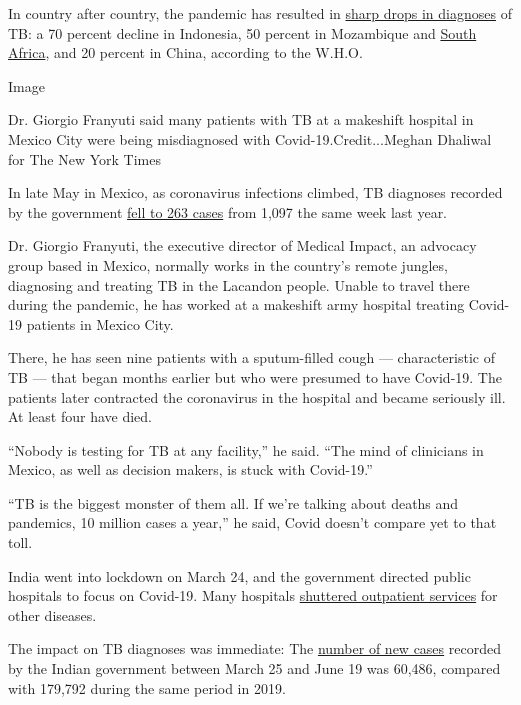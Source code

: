 In country after country, the pandemic has resulted in
\href{https://www.medrxiv.org/content/10.1101/2020.04.28.20079582v1}{sharp
drops in diagnoses} of TB: a 70 percent decline in Indonesia, 50 percent
in Mozambique and
\href{https://www.nicd.ac.za/wp-content/uploads/2020/05/Impact-of-Covid-19-interventions-on-TB-testing-in-South-Africa-10-May-2020.pdf}{South
Africa}, and 20 percent in China, according to the W.H.O.

Image

Dr. Giorgio Franyuti said many patients with TB at a makeshift hospital
in Mexico City were being misdiagnosed with Covid-19.Credit...Meghan
Dhaliwal for The New York Times

In late May in Mexico, as coronavirus infections climbed, TB diagnoses
recorded by the government
\href{https://www.gob.mx/salud/acciones-y-programas/direccion-general-de-epidemiologia-boletin-epidemiologico}{fell
to 263 cases} from 1,097 the same week last year.

Dr. Giorgio Franyuti, the executive director of Medical Impact, an
advocacy group based in Mexico, normally works in the country's remote
jungles, diagnosing and treating TB in the Lacandon people. Unable to
travel there during the pandemic, he has worked at a makeshift army
hospital treating Covid-19 patients in Mexico City.

There, he has seen nine patients with a sputum-filled cough ---
characteristic of TB --- that began months earlier but who were presumed
to have Covid-19. The patients later contracted the coronavirus in the
hospital and became seriously ill. At least four have died.

``Nobody is testing for TB at any facility,'' he said. ``The mind of
clinicians in Mexico, as well as decision makers, is stuck with
Covid-19.''

``TB is the biggest monster of them all. If we're talking about deaths
and pandemics, 10 million cases a year,'' he said, Covid doesn't compare
yet to that toll.

India went into lockdown on March 24, and the government directed public
hospitals to focus on Covid-19. Many hospitals
\href{https://timesofindia.indiatimes.com/india/how-covid-war-is-hurting-indias-non-covid-patients/articleshow/74949121.cms}{shuttered
outpatient services} for other diseases.

The impact on TB diagnoses was immediate: The
\href{https://reports.nikshay.in/Reports/TBNotification}{number of new
cases} recorded by the Indian government between March 25 and June 19
was 60,486, compared with 179,792 during the same period in 2019.

